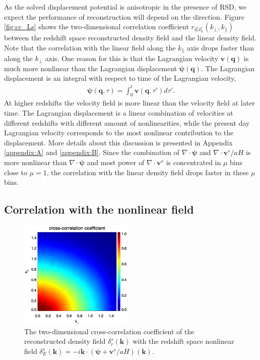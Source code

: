 \documentclass[aps,prd,twocolumn,superscriptaddress,groupedaddress,nofootinbib,amsfont]{revtex4}  %
\newcommand{\bea}{\begin{eqnarray}}
\newcommand{\eea}{\end{eqnarray}}
\newcommand{\bmp}{\bm{\psi}}
\newcommand{\bmv}{\bm{v}}
\newcommand{\bmk}{\bm{k}}
\newcommand{\bmq}{\bm{q}}
\begin{document}
As the solved displacement potential is anisotropic in the presence of RSD, we
expect the performance of reconstruction will depend on the direction.
Figure \ref{fig:cc_Ls} shows the two-dimensional correlation coefficient $r_{\delta_r^s\delta_L^s}(k_\perp, k_\parallel)$ between the redshift space reconstructed density field and the linear density field. 
Note that the correlation with the linear field along the $k_\parallel$ axis
drops faster than along the $k_\perp$ axis.
One reason for this is that the Lagrangian velocity $\bmv(\bmq)$ is much more 
nonlinear than the Lagrangian displacement $\bmp(\bmq)$. The Lagrangian 
displacement is an integral with respect to time of the Lagrangian velocity,
\bea
\bmp(\bmq,\tau)=\int_0^t\bmv(\bmq,\tau')d\tau'.
\eea
At higher redshifts the velocity field is more linear than the velocity field 
at later time. The Lagrangian displacement is a linear combination of velocities
at different redshifts with different amount of nonlinearities, while the 
present day Lagrangian velocity corresponds to the most nonlinear contribution
to the displacement. More details about this discussion is presented in Appendix
\ref{appendix:A} and \ref{appendix:B}.
Since the combination of $\nabla\cdot\bmp$ and $\nabla\cdot\bmv^s/aH$ is more
nonlinear than $\nabla\cdot\bmp$ and most power of $\nabla\cdot\bmv^s$ is 
concentrated in $\mu$ bins close to $\mu=1$, the correlation with the linear 
density field drops faster in these $\mu$ bins.

\subsection{Correlation with the nonlinear field}

\begin{figure}[tbp]
\begin{center}
\includegraphics[width=0.48\textwidth]{0.000anixcc_deltaRsxEs_4x.eps}
\end{center}
\vspace{-0.7cm}
\caption{The two-dimensional cross-correlation coefficient of the reconstructed
density field $\delta_r^s(\bmk)$ with the redshift space nonlinear field 
$\delta_E^s(\bmk)=-i\bmk\cdot(\bmp+\bmv^s/aH)(\bmk)$.}
\label{fig:cc_Es}
\end{figure}
\end{document}

